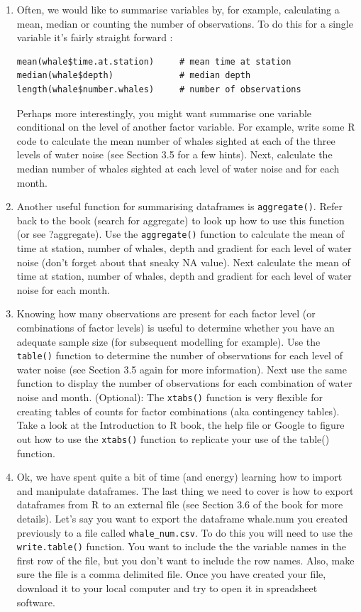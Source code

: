 \documentclass[12pt]{article}
\newcommand{\lst}[1]{\lstinline{#1}}
\begin{document}
\begin{enumerate}
 

\item Often, we would like to summarise variables by, for example, calculating a mean, median or counting the number of observations. To do this for a single variable it’s fairly straight forward :

 
\begin{lstlisting}
mean(whale$time.at.station)     # mean time at station
median(whale$depth)             # median depth
length(whale$number.whales)     # number of observations
\end{lstlisting}

 Perhaps more interestingly, you might want summarise one variable conditional on the level of another factor variable. For example, write some R code to calculate the mean number of whales sighted at each of the three levels of water noise (see Section 3.5 for a few hints). Next, calculate the median number of whales sighted at each level of water noise and for each month.

 

\item Another useful function for summarising dataframes is \lst{aggregate()}. Refer back to the book (search for aggregate) to look up how to use this function (or see ?aggregate). Use the \lst{aggregate()} function to calculate the mean of time at station, number of whales, depth and gradient for each level of water noise (don’t forget about that sneaky NA value). Next calculate the mean of time at station, number of whales, depth and gradient for each level of water noise for each month.
 

\item Knowing how many observations are present for each factor level (or combinations of factor levels) is useful to determine whether you have an adequate sample size (for subsequent modelling for example). Use the \lst{table()} function to determine the number of observations for each level of water noise (see Section 3.5 again for more information). Next use the same function to display the number of observations for each combination of water noise and month. (Optional): The \lst{xtabs()} function is very flexible for creating tables of counts for factor combinations (aka contingency tables). Take a look at the Introduction to R book, the help file or Google to figure out how to use the \lst{xtabs()} function to replicate your use of the table() function.


\item Ok, we have spent quite a bit of time (and energy) learning how to import and manipulate dataframes. The last thing we need to cover is how to export dataframes from R to an external file (see Section 3.6 of the book for more details). Let’s say you want to export the dataframe whale.num you created previously  to a file called \verb|whale_num.csv|. To do this you will need to use the 
\lst{write.table()} function. You want to include the the variable names in the first row of the file, but you don’t want to include the row names. Also, make sure the file is a comma delimited file. Once you have created your file,
download it to your local computer and try to open it in spreadsheet software.


\end{enumerate}
\end{document}
